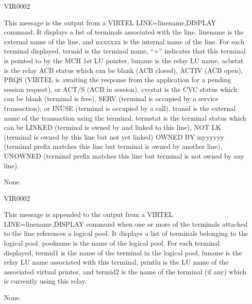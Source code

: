 \documentclass[letterpaper,10pt,english]{sphinxmanual}
\begin{document}
\begin{description}
\sphinxAtStartPar
VIR0002

\sphinxAtStartPar
This message is the output from a VIRTEL LINE=linename,DISPLAY command. It displays a list of terminals associated with the line. linename is the external name of the line, and n\sphinxhyphen{}xxxxxx is the internal name of the line. For each terminal displayed, termid is the terminal name, “+” indicates that this terminal is pointed to by the MCH 1st LU pointer, luname is the relay LU name, acbstat is the relay ACB status which can be blank (ACB closed), ACTIV (ACB open), P\sphinxhyphen{}RQS (VIRTEL is awaiting the response from the application for a pending session request), or ACT/S (ACB    in session). cvcstat is the CVC status which can be blank (terminal is free), SERV (terminal is occupied by a service transaction), or INUSE (terminal is occupied by a call). tranid is the external name of the transaction using the terminal. termstat is the terminal status which can be LINKED (terminal is owned by and linked to this line), NOT LK (terminal is owned by this line but not yet linked) OWNED BY m\sphinxhyphen{}yyyyyy (terminal prefix matches this line but terminal is owned by another line), UNOWNED (terminal prefix matches this line but terminal is not owned by any line).

\sphinxAtStartPar
None.

\end{description}
\begin{description}
\sphinxAtStartPar
VIR0002

\sphinxAtStartPar
This message is appended to the output from a VIRTEL LINE=linename,DISPLAY command when one or more of the terminals attached to the line references a logical pool. It displays a list of terminals belonging to the logical pool.  poolname is the name of the logical pool. For each terminal displayed, termid1 is the name of the terminal in the logical pool, luname is the relay LU name associated with this terminal, printlu is the LU name of the associated virtual printer, and termid2 is the name of the terminal (if any) which is currently using this relay.

\sphinxAtStartPar
None.

\end{description}
\end{document}
